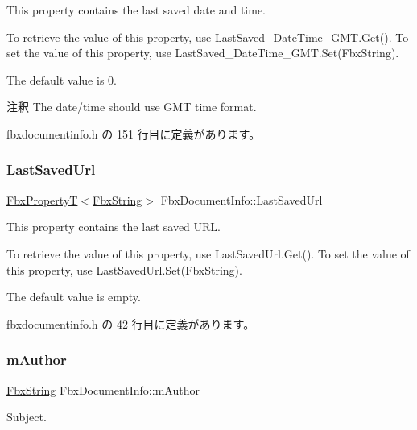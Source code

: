 This property contains the last saved date and time.

To retrieve the value of this property, use Last\+Saved\+\_\+\+Date\+Time\+\_\+\+G\+M\+T.\+Get(). To set the value of this property, use Last\+Saved\+\_\+\+Date\+Time\+\_\+\+G\+M\+T.\+Set(\+Fbx\+String).

The default value is 0.

\begin{DoxyRemark}{注釈}
The date/time should use G\+MT time format. 
\end{DoxyRemark}


 fbxdocumentinfo.\+h の 151 行目に定義があります。

\mbox{\label{class_fbx_document_info_a8a4eb2393037c8989307f780cab77ca1}} 
\subsubsection{\texorpdfstring{Last\+Saved\+Url}{LastSavedUrl}}
{\footnotesize\ttfamily \hyperlink{class_fbx_property_t}{Fbx\+PropertyT}$<$\hyperlink{class_fbx_string}{Fbx\+String}$>$ Fbx\+Document\+Info\+::\+Last\+Saved\+Url}

This property contains the last saved U\+RL.

To retrieve the value of this property, use Last\+Saved\+Url.\+Get(). To set the value of this property, use Last\+Saved\+Url.\+Set(\+Fbx\+String).

The default value is empty. 

 fbxdocumentinfo.\+h の 42 行目に定義があります。

\mbox{\label{class_fbx_document_info_a94f6f7586adf1ae4c519f0fd0ab63e7f}} 
\subsubsection{\texorpdfstring{m\+Author}{mAuthor}}
{\footnotesize\ttfamily \hyperlink{class_fbx_string}{Fbx\+String} Fbx\+Document\+Info\+::m\+Author}



Subject. 



